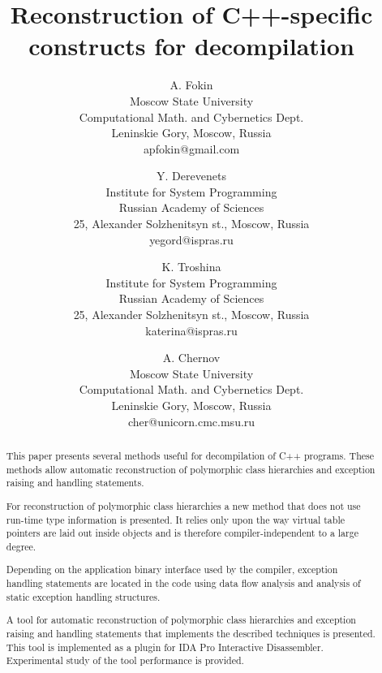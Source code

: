 \documentclass[times, 10pt,twocolumn]{article}
\renewcommand{\~}{{\raise.35ex\hbox{$\scriptstyle\sim$}}}
\begin{document}
\title{Reconstruction of C++-specific constructs for decompilation}

\author{
A. Fokin\\
Moscow State University\\
Computational Math. and Cybernetics Dept.\\
Leninskie Gory, Moscow, Russia\\
apfokin@gmail.com
\and
Y. Derevenets\\
Institute for System Programming\\
Russian Academy of Sciences\\
25, Alexander Solzhenitsyn st., Moscow, Russia\\
yegord@ispras.ru\\
\and
K. Troshina\\
Institute for System Programming\\
Russian Academy of Sciences\\
25, Alexander Solzhenitsyn st., Moscow, Russia\\
katerina@ispras.ru
\and
A. Chernov\\
Moscow State University\\
Computational Math. and Cybernetics Dept.\\
Leninskie Gory, Moscow, Russia\\
cher@unicorn.cmc.msu.ru
}

\maketitle

\begin{abstract}
This paper presents several methods useful for decompilation of C++ programs.
These methods allow automatic reconstruction of polymorphic class hierarchies
and exception raising and handling statements.

For reconstruction of polymorphic class hierarchies a new method
that does not use run-time type information is presented.
It relies only upon the way virtual table pointers are laid out inside objects
and is therefore compiler-independent to a large degree.

Depending on the application binary interface used by the compiler,
exception handling statements are located in the code using
data flow analysis and analysis of static exception handling structures.

A tool for automatic reconstruction of polymorphic class hierarchies
and exception raising and handling statements that implements the described techniques is presented.
This tool is implemented as a plugin for IDA Pro Interactive Disassembler.
Experimental study of the tool performance is provided.
\end{abstract}
\end{document}
